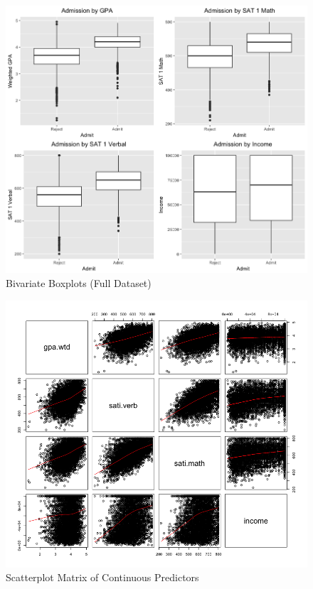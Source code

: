\documentclass[titlepage]{article}   	%
\begin{document}
\begin{figure} [h]
\centering
\includegraphics[scale=.50]{bivariate}
\caption{Bivariate Boxplots (Full Dataset)}
\end{figure}

\begin{figure} [h]
\centering
\includegraphics[scale=.50]{scatterplotmatrix}
\caption{Scatterplot Matrix of Continuous Predictors}
\end{figure}
\end{document}
